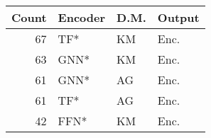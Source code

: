 \begin{tabular}{rlll}
\toprule
Count & Encoder & D.M. & Output \\
\midrule
67 & TF* & KM & Enc. \\
63 & GNN* & KM & Enc. \\
61 & GNN* & AG & Enc. \\
61 & TF* & AG & Enc. \\
42 & FFN* & KM & Enc. \\
\bottomrule
\end{tabular}
